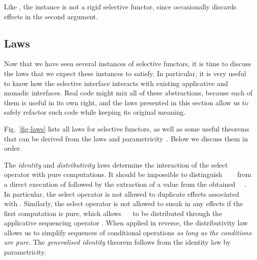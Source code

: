 {\noindent
Like , the  instance is not a rigid selective functor,
since  occasionally discards effects in the second argument.

\subsection{Laws}\label{sec-laws}

Now that we have seen several instances of selective functors, it is time to
discuss the laws that we expect these instances to satisfy. In particular, it is
very useful to know how the selective interface interacts with existing
applicative and monadic interfaces. Real code might mix all of these
abstractions, because each of them is useful in its own right, and the laws
presented in this section allow us to safely refactor such code while keeping
its original meaning.

Fig.~\ref{fig-laws} lists all laws for selective functors, as well as some
useful theorems that can be derived from the laws and
parametricity~\citep{wadler1989theorems}. Below we discuss them in order.

The \emph{identity} and \emph{distributivity} laws determine the interaction of
the select operator with pure computations. It should be impossible to
distinguish ~~~ from a direct execution of 
followed by the extraction of a value from the obtained
~~. In particular, the select operator is not allowed to
duplicate effects associated with . Similarly, the select operator is not
allowed to sneak in any effects if the first computation is pure, which allows
~~ to be distributed through the applicative sequencing
operator \hs{*>}. When applied in reverse, the distributivity law allows us to
simplify sequences of conditional operations \emph{as long as the conditions are
pure}. The \emph{generalised identity} theorem follows from the identity law by
parametricity.

}

